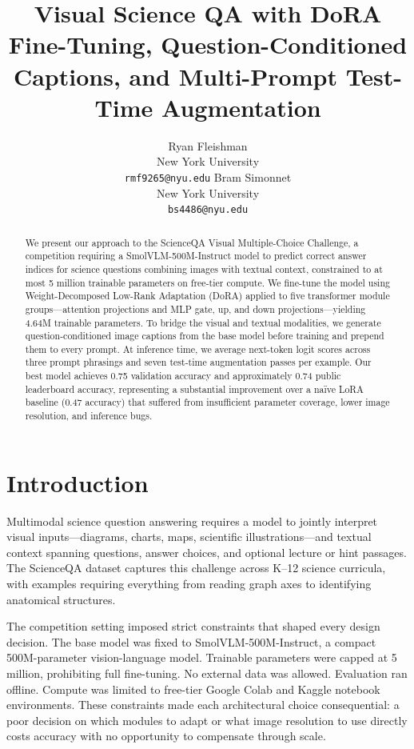 \documentclass[11pt]{article}
\title{Visual Science QA with DoRA Fine-Tuning, Question-Conditioned Captions, and Multi-Prompt Test-Time Augmentation}
\author{
Ryan Fleishman \\
New York University \\
\texttt{rmf9265@nyu.edu}
\And
Bram Simonnet \\
New York University \\
\texttt{bs4486@nyu.edu}
}
\begin{document}
\maketitle
\begin{abstract}
We present our approach to the ScienceQA Visual Multiple-Choice Challenge, a competition requiring a SmolVLM-500M-Instruct model to predict correct answer indices for science questions combining images with textual context, constrained to at most 5 million trainable parameters on free-tier compute. We fine-tune the model using Weight-Decomposed Low-Rank Adaptation (DoRA) applied to five transformer module groups---attention projections and MLP gate, up, and down projections---yielding 4.64M trainable parameters. To bridge the visual and textual modalities, we generate question-conditioned image captions from the base model before training and prepend them to every prompt. At inference time, we average next-token logit scores across three prompt phrasings and seven test-time augmentation passes per example. Our best model achieves 0.75 validation accuracy and approximately 0.74 public leaderboard accuracy, representing a substantial improvement over a na\"{i}ve LoRA baseline (0.47 accuracy) that suffered from insufficient parameter coverage, lower image resolution, and inference bugs.
\end{abstract}

\section{Introduction}

Multimodal science question answering requires a model to jointly interpret visual inputs---diagrams, charts, maps, scientific illustrations---and textual context spanning questions, answer choices, and optional lecture or hint passages. The ScienceQA dataset captures this challenge across K--12 science curricula, with examples requiring everything from reading graph axes to identifying anatomical structures.

The competition setting imposed strict constraints that shaped every design decision. The base model was fixed to SmolVLM-500M-Instruct, a compact 500M-parameter vision-language model. Trainable parameters were capped at 5 million, prohibiting full fine-tuning. No external data was allowed. Evaluation ran offline. Compute was limited to free-tier Google Colab and Kaggle notebook environments. These constraints made each architectural choice consequential: a poor decision on which modules to adapt or what image resolution to use directly costs accuracy with no opportunity to compensate through scale.
\end{document}
